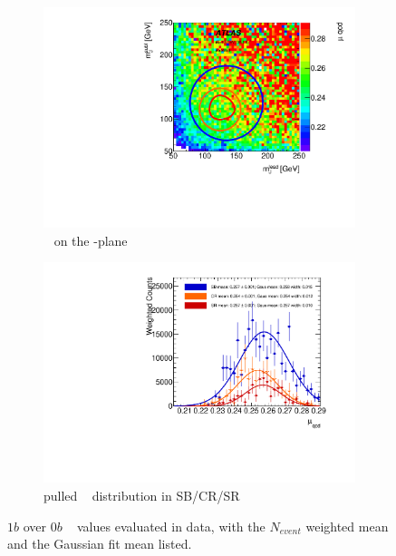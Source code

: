 \begin{figure}[htbp!]
\centering
\captionsetup{justification=centering}
	\hspace{-1cm}
    \begin{subfigure}[b]{0.4\textwidth}
        \includegraphics[width=\textwidth,angle=-90]{figures/boosted/AppendixMuqcdstudy/OneTag_Incl_mH0H1.pdf}
        \caption{\muqcd~ on the \mleadJ-\msublJ plane}
        \label{fig:app-muqcd-1b-2d}
    \end{subfigure}
    \quad \quad \quad \quad 
    \begin{subfigure}[b]{0.4\textwidth}
        \includegraphics[width=\textwidth,angle=-90]{figures/boosted/AppendixMuqcdstudy/OneTag_Incl_mH0H1_pull.pdf}
        \caption{pulled \muqcd~ distribution in SB/CR/SR}
        \label{fig:app-muqcd-1b-pull}
    \end{subfigure}
\caption{$1b$ over $0b$ \muqcd~ values evaluated in data, with the $N_{event}$ weighted mean and the Gaussian fit mean listed.}
\label{fig:app-muqcd-1b}
\end{figure}

